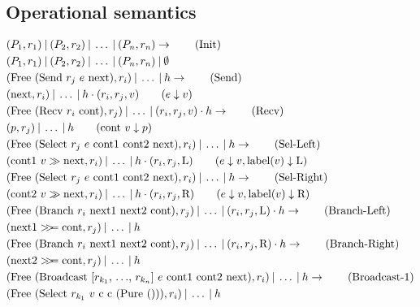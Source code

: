 \subsection{Operational semantics}
\begin{table}[ht]
\begin{align*}
    &(P_1, r_1) \Par (P_2, r_2) \Par \ldots \Par (P_n, r_n) \rightarrow \tag{Init}\\ 
    &(P_1, r_1) \Par (P_2, r_2) \Par \ldots \Par (P_n, r_n) \Par \emptyset \notag\\ 
    &(\text{Free (Send $r_j$ $e$ next)}, r_i) \Par \ldots \Par h \rightarrow  \tag{Send}\\ 
    &(\text{next} , r_i) \Par \ldots \Par h \cdot (r_i, r_j, v) \qquad (e \downarrow v) \notag\\ 
    &(\text{Free (Recv $r_i$ cont)}, r_j) \Par \ldots \Par (r_i, r_j, v) \cdot h \rightarrow  \tag{Recv}\\ 
    &(p, r_j) \Par \ldots \Par h \qquad (\text{cont $v$} \downarrow p)\notag\\ 
    &(\text{Free (Select $r_j$ $e$ cont1 cont2 next)}, r_i) \Par \ldots \Par h \rightarrow  \tag{Sel-Left}\\ 
    &(\text{cont1 $v$} \gg \text{next}, r_i) \Par \ldots \Par h \cdot (r_i, r_j, \text{L}) \qquad (e \downarrow v, \text{label}(v) \downarrow \text{L}) \notag\\ 
    &(\text{Free (Select $r_j$ $e$ cont1 cont2 next)}, r_i) \Par \ldots \Par h \rightarrow  \tag{Sel-Right}\\ 
    &(\text{cont2 $v$} \gg \text{next}, r_i) \Par \ldots \Par h \cdot (r_i, r_j, \text{R}) \qquad (e \downarrow v, \text{label}(v) \downarrow \text{R}) \notag\\ 
    &(\text{Free (Branch $r_i$ next1 next2 cont)}, r_j) \Par \ldots \Par (r_i, r_j, \text{L}) \cdot h \rightarrow  \tag{Branch-Left}\\ 
    &(\text{next1} >\!\!>\!\!= \text{cont}, r_j) \Par \ldots \Par h \notag\\ 
    &(\text{Free (Branch $r_i$ next1 next2 cont)}, r_j) \Par \ldots \Par (r_i, r_j, \text{R}) \cdot h \rightarrow  \tag{Branch-Right}\\ 
    &(\text{next2} >\!\!>\!\!= \text{cont}, r_j) \Par \ldots \Par h \notag\\ 
    &(\text{Free (Broadcast [$r_{k_1}$, $\ldots$, $r_{k_n}$] $e$ cont1 cont2 next)}, r_i) \Par \ldots \Par h \rightarrow  \tag{Broadcast-1}\\ 
    &(\text{Free (Select $r_{k_1}$ $v$ c c (Pure ()))}, r_i) \Par \ldots \Par h \notag\\ 

\end{align*}
\end{table}
